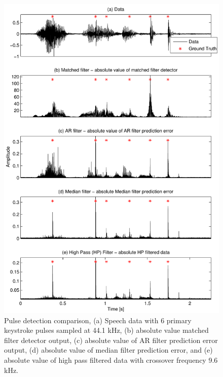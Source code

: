 \begin{figure}[!] %
\centering
\includegraphics[width=130mm]{LitRev_DetectCompare.pdf}
\caption{Pulse detection comparison, (a) Speech data with 6 primary keystroke pulses sampled at 44.1 kHz, (b) absolute value matched filter detector output, (c) absolute value of AR filter prediction error output, (d) absolute value of median filter prediction error, and (e) absolute value of high pass filtered data with crossover frequency 9.6 kHz.}
\label{fig:LitRev_DetectCompare}
\end{figure}


